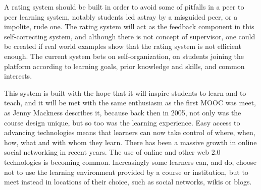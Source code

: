 A rating system should be built in order to avoid some of pitfalls in a peer to
peer learning system, notably students led astray by a misguided peer, or a
impolite, rude one. The rating system will act as the feedback component in this
self-correcting system, and although there is not concept of supervisor, one
could be created if real world examples show that the rating system is not
efficient enough. The current system bets on self-organization, on students
joining the platform according to learning goals, prior knowledge and skills,
and common interests.

This system is built with the hope that it will inspire students to learn and
to teach, and it will be met with the same enthusiasm as the first MOOC was meet,
as Jenny Mackness describes it, because back then in 2005, not only was the
course design unique, but so too was the learning experience.  Easy access to
advancing technologies means that learners can now take control of where, when,
how, what and with whom they learn. There has been a massive growth in online
social networking in recent years. The use of online and other web 2.0
technologies is becoming common. Increasingly some learners can, and do, choose
not to use the learning environment provided by a course or institution, but to
meet instead in locations of their choice, such as social networks, wikis or
blogs\citep{thefirstmoocexp}.

\clearpage
